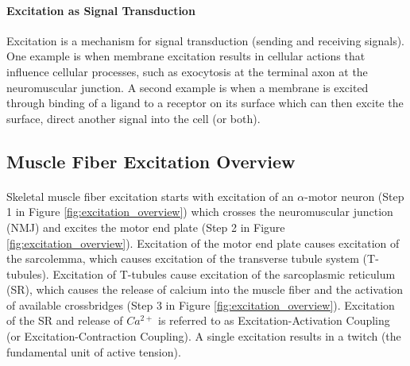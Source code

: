 \paragraph{Excitation as Signal Transduction}
Excitation is a mechanism for signal transduction (sending and receiving signals). One example is when membrane excitation results in cellular actions that influence cellular processes, such as exocytosis\footnotemark{} at the terminal axon at the neuromuscular junction. A second example is when a membrane is excited through binding of a ligand\footnotemark{} to a receptor on its surface which can then excite the surface, direct another signal into the cell (or both). 

\subsection{Muscle Fiber Excitation Overview}
\paragraph{}

Skeletal muscle fiber excitation starts with excitation of an $\alpha$-motor neuron (Step 1 in Figure \ref{fig:excitation_overview}) which crosses the neuromuscular junction (NMJ) and excites the motor end plate (Step 2 in Figure \ref{fig:excitation_overview}). Excitation of the motor end plate causes excitation of the sarcolemma, which causes excitation of the transverse tubule system (T-tubules). Excitation of T-tubules cause excitation of the sarcoplasmic reticulum (SR), which causes the release of calcium into the muscle fiber and the activation of available crossbridges (Step 3 in Figure \ref{fig:excitation_overview}). Excitation of the SR and release of $Ca^{2+}$ is referred to as Excitation-Activation Coupling (or Excitation-Contraction Coupling). A single excitation results in a twitch (the fundamental unit of active tension).

